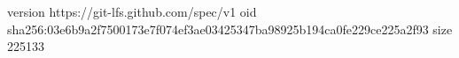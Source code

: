 version https://git-lfs.github.com/spec/v1
oid sha256:03e6b9a2f7500173e7f074ef3ae03425347ba98925b194ca0fe229ce225a2f93
size 225133
